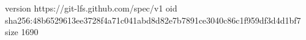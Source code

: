 version https://git-lfs.github.com/spec/v1
oid sha256:48b6529613ee3728f4a71c041abd8d82e7b7891ce3040c86c1f959df3d4d1bf7
size 1690
